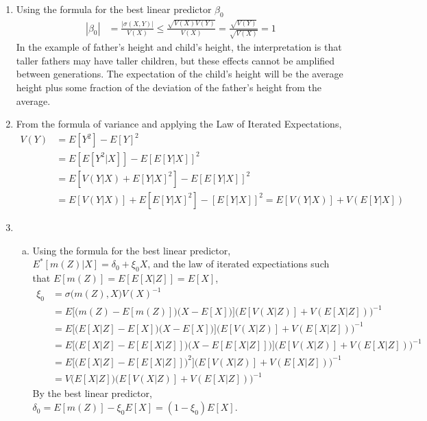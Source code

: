 \documentclass{article}[14pt]
\begin{document}
\begin{enumerate}
    \item Using the formula for the best linear predictor $\beta_0$
    \begin{align*}
        |\beta_0| &= \frac{ | \sigma(X,Y) | }{V(X)} \leq \frac{ \sqrt{V(X)V(Y)} }{V(X)} = \frac{ \sqrt{V(Y)} }{ \sqrt{V(X)}} = 1
    \end{align*}
    In the example of father's height and child's height, the interpretation is that taller fathers may have taller children, but these effects cannot be amplified between generations. The expectation of the child's height will be the average height plus some fraction of the deviation of the father's height from the average.

    \item From the formula of variance and applying the Law of Iterated Expectations,
    \begin{align*}
        V(Y) &= E [Y^2] - E[Y]^2 \\
        &= E [ E [Y^2|X] ] - E [E[Y|X]]^2 \\
        &= E [ V(Y|X) + E[Y|X]^2 ] - E [E[Y|X]]^2 \\
        &= E [ V(Y|X) ] + E [ E[Y|X]^2] - [E[Y|X]]^2 = E [ V(Y|X) ] + V ( E [Y|X])
    \end{align*}

    \item
    \begin{enumerate}[(a)]
        \item Using the formula for the best linear predictor, $E^*[m(Z) | X]= \delta_0 + \xi_0 X$, and the law of iterated expectiations such that $E[m(Z)] = E[E[X|Z]] = E[X]$,
        \begin{align*}
            \xi_0 &= \sigma\Big(m(Z),X\Big) V(X)^{-1} \\
            &= E\bigg[\Big(m(Z) - E[m(Z)]\Big)\Big(X - E[X]\Big)\bigg] \Big( E[V(X|Z)] + V(E[X|Z]) \Big)^{-1}\\
            &= E\bigg[\Big(E[X|Z] - E[X]\Big)\Big(X - E[X]\Big)\bigg] \Big( E[V(X|Z)] + V(E[X|Z]) \Big)^{-1} \\
            &= E\bigg[\Big(E[X|Z] - E[E[X|Z]]\Big)\Big(X - E[E[X|Z]]\Big)\bigg] \Big( E[V(X|Z)] + V(E[X|Z]) \Big)^{-1} \\
            &= E\bigg[\Big(E[X|Z] - E[E[X|Z]]\Big)^2\bigg] \Big( E[V(X|Z)] + V(E[X|Z]) \Big)^{-1} \\
            &= V\Big(E[X|Z]\Big) \Big( E[V(X|Z)] + V(E[X|Z]) \Big)^{-1}
        \end{align*}
        By the best linear predictor, $\delta_0 = E[m(Z)] - \xi_0 E[X] = (1-\xi_0) E[X]$.


\end{enumerate}
\end{enumerate}
\end{document}
